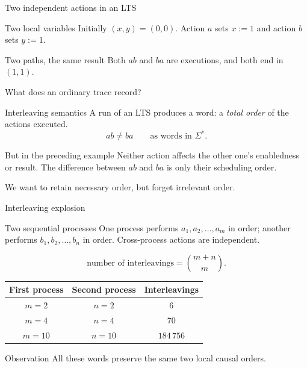 \documentclass[t,11pt]{beamer}
\begin{document}
\begin{frame}{Two independent actions in an LTS}
  \begin{block}{Two local variables}
    Initially $(x,y)=(0,0)$. Action $a$ sets $x:=1$ and action $b$ sets $y:=1$.
  \end{block}
  \vspace{0.1cm}
  \begin{center}
  \end{center}
  \begin{block}{Two paths, the same result}
    Both $ab$ and $ba$ are executions, and both end in $(1,1)$.
  \end{block}
\end{frame}

\begin{frame}{What does an ordinary trace record?}
  \begin{block}{Interleaving semantics}
    A run of an LTS produces a word: a \emph{total order} of the actions executed.
    \[
      ab\neq ba \qquad \text{as words in }\Sigma^*.
    \]
  \end{block}
  \begin{block}{But in the preceding example}
    Neither action affects the other one's enabledness or result. The difference between $ab$ and $ba$ is only their scheduling order.
  \end{block}
  \vspace{0.12cm}
  \centering\large We want to retain necessary order, but forget irrelevant order.
\end{frame}

\begin{frame}{Interleaving explosion}
  \begin{block}{Two sequential processes}
    One process performs $a_1,a_2,\ldots,a_m$ in order; another performs $b_1,b_2,\ldots,b_n$ in order. Cross-process actions are independent.
  \end{block}
  \[
    \text{number of interleavings}=\binom{m+n}{m}.
  \]
  \begin{center}
  \begin{tabular}{c|c|c}
  First process & Second process & Interleavings\\ \hline
  $m=2$ & $n=2$ & $6$\\
  $m=4$ & $n=4$ & $70$\\
  $m=10$ & $n=10$ & $184\,756$
  \end{tabular}
  \end{center}
  \begin{block}{Observation}
    All these words preserve the same two local causal orders.
  \end{block}
\end{frame}
\end{document}
